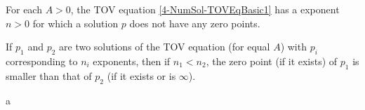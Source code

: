 \begin{theorem}
	For each $A>0$, the TOV equation \ref{4-NumSol-TOVEqBasic1} has a exponent $n>0$ for which a solution $p$ does not have any zero points.
\end{theorem}
\begin{theorem}
	If $p_1$ and $p_2$ are two solutions of the TOV equation (for equal $A$) with $p_i$ corresponding to $n_i$ exponents, then if $n_1<n_2$, the zero point (if it exists) of $p_1$ is smaller than that of $p_2$ (if it exists or is $\infty$).
\end{theorem}
\begin{theorem}
	a 
\end{theorem}




